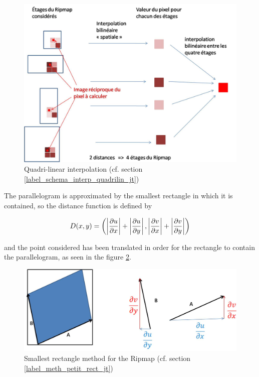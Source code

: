 \label{label_schema_interp_quadrilin_jt}
\begin{figure}[h!]
\centering
\includegraphics[scale=0.5]{interbibilineaire.jpg}
\caption{Quadri-linear interpolation (cf. section \ref{label_schema_interp_quadrilin_jt})}
\label{interbibilineaire}
\end{figure}

The parallelogram is approximated by the smallest rectangle in which it is contained, so the distance function is defined by

$$D(x,y) = \left( \left|\frac{\partial u}{\partial x}\right|+\left|\frac{\partial u}{\partial y}\right|,\left|\frac{\partial v}{\partial x}\right|+\left|\frac{\partial v}{\partial y}\right|\right)$$

and the point considered has been translated in order for the rectangle to contain the parallelogram, as seen in the figure  \ref{methode_distance_ripmap}.


\label{label_meth_petit_rect_jt}
\begin{figure}[h!]
\centering
\includegraphics[scale=0.5]{methode_distance_ripmap.jpg}
\caption{Smallest rectangle method for the Ripmap (cf. section \ref{label_meth_petit_rect_jt})}
\label{methode_distance_ripmap}
\end{figure}

